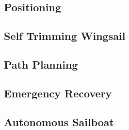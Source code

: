 
\subsection{Positioning}



\subsection{Self Trimming Wingsail}


\subsection{Path Planning}


\subsection{Emergency Recovery}


\subsection{Autonomous Sailboat}
